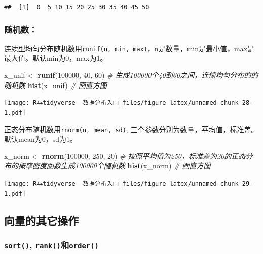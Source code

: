 \documentclass[]{book}
\newenvironment{Shaded}{\begin{snugshade}}{\end{snugshade}}
\newcommand{\CommentTok}[1]{\textcolor[rgb]{0.56,0.35,0.01}{\textit{#1}}}
\newcommand{\DecValTok}[1]{\textcolor[rgb]{0.00,0.00,0.81}{#1}}
\newcommand{\KeywordTok}[1]{\textcolor[rgb]{0.13,0.29,0.53}{\textbf{#1}}}
\newcommand{\NormalTok}[1]{#1}
\newcommand{\StringTok}[1]{\textcolor[rgb]{0.31,0.60,0.02}{#1}}
\begin{document}
\begin{verbatim}
##  [1]  0  5 10 15 20 25 30 35 40 45 50
\end{verbatim}

\subsubsection{随机数：}

连续型均匀分布随机数用\texttt{runif(n,\ min,\ max)}，n是数量，min是最小值，max是最大值。默认min为0，max为1。

\begin{Shaded}
\begin{Highlighting}[]
\NormalTok{x_unif <-}\StringTok{ }\KeywordTok{runif}\NormalTok{(}\DecValTok{100000}\NormalTok{, }\DecValTok{40}\NormalTok{, }\DecValTok{60}\NormalTok{) }\CommentTok{# 生成100000个40到60之间，连续均匀分布的的随机数}
\KeywordTok{hist}\NormalTok{(x_unif) }\CommentTok{# 画直方图}
\end{Highlighting}
\end{Shaded}

\texttt{[image: R与tidyverse——数据分析入门\_files/figure-latex/unnamed-chunk-28-1.pdf]}

正态分布随机数用\texttt{rnorm(n,\ mean,\ sd)}, 三个参数分别为数量，平均值，标准差。默认mean为0，sd为1。

\begin{Shaded}
\begin{Highlighting}[]
\NormalTok{x_norm <-}\StringTok{ }\KeywordTok{rnorm}\NormalTok{(}\DecValTok{100000}\NormalTok{, }\DecValTok{250}\NormalTok{, }\DecValTok{20}\NormalTok{) }\CommentTok{# 按照平均值为250，标准差为20的正态分布的概率密度函数生成100000个随机数}
\KeywordTok{hist}\NormalTok{(x_norm) }\CommentTok{# 画直方图}
\end{Highlighting}
\end{Shaded}

\texttt{[image: R与tidyverse——数据分析入门\_files/figure-latex/unnamed-chunk-29-1.pdf]}

\subsection{向量的其它操作}

\hypertarget{sort-rankorder}{%
\subsubsection{\texorpdfstring{\texttt{sort()}, \texttt{rank()}和\texttt{order()}}{sort(), rank()和order()}}\label{sort-rankorder}}
\end{document}
